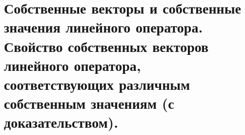 \section{
    Собственные векторы и собственные значения линейного оператора. Свойство собственных векторов линейного оператора, соответствующих различным собственным значениям (с доказательством).
}


